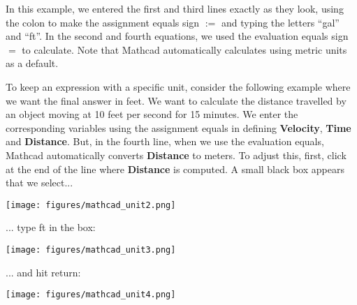 
In this example, we entered the first and third lines exactly as they look, using the colon to make the assignment equals sign $:=$ and typing the letters ``gal'' and ``ft''.  In the second and fourth equations, we used the evaluation equals sign $=$ to calculate.  Note that Mathcad automatically calculates using metric units as a default.

To keep an expression with a specific unit, consider the following example where we want the final answer in feet.  We want to calculate the distance travelled by an object moving at 10 feet per second for 15 minutes. We enter the corresponding variables using the assignment equals in defining \textbf{Velocity}, \textbf{Time} and \textbf{Distance}.  But, in the fourth line, when we use the evaluation equals, Mathcad automatically converts \textbf{Distance} to meters.  To adjust this, first, click at the end of the line where \textbf{Distance} is computed. A small black box appears that we select...


\begin{center}
\texttt{[image: figures/mathcad\_unit2.png]} %
\end{center}

... type ft in the box:


\begin{center}
\texttt{[image: figures/mathcad\_unit3.png]} %
\end{center}

... and hit return:


\begin{center}
\texttt{[image: figures/mathcad\_unit4.png]} %
\end{center}


\newpage
{}


